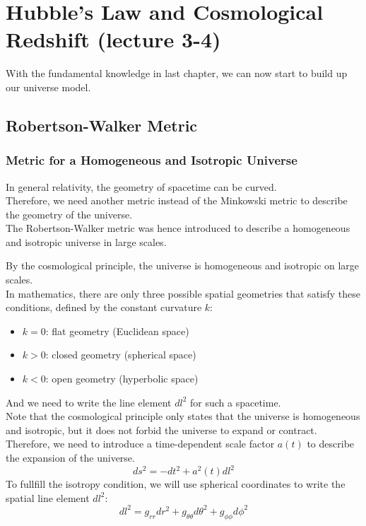 
\chapter{Hubble's Law and Cosmological Redshift (lecture 3-4)}
With the fundamental knowledge in last chapter, we can now start to build up our universe model. \\
\section{Robertson-Walker Metric}
\subsection{Metric for a Homogeneous and Isotropic Universe}
\begin{intuition}
    In general relativity, the geometry of spacetime can be curved. \\
    Therefore, we need another metric instead of the Minkowski metric to describe the geometry of the universe. \\
    The Robertson-Walker metric was hence introduced to describe a homogeneous and isotropic universe in large scales. 
\end{intuition}

\bigskip\noindent
\begin{theory}
    By the cosmological principle, the universe is homogeneous and isotropic on large scales. \\
    In mathematics, there are only three possible spatial geometries that satisfy these conditions, defined by the constant curvature $k$:
    \begin{itemize}
        \item $k = 0$: flat geometry (Euclidean space)
        \item $k > 0$: closed geometry (spherical space)   
        \item $k < 0$: open geometry (hyperbolic space)
    \end{itemize}

    And we need to write the line element $dl^2$ for such a spacetime. \\
    Note that the cosmological principle only states that the universe is homogeneous and isotropic, but it does not forbid the universe to expand or contract. \\
    Therefore, we need to introduce a time-dependent scale factor $a(t)$ to describe the expansion of the universe. \\
    \[
        ds^2 = -dt^2 + a^2(t) dl^2
    \]
    To fullfill the isotropy condition, we will use spherical coordinates to write the spatial line element $dl^2$:
    \[
        dl^2 = g_{rr} dr^2 + g_{\theta\theta} d\theta^2 + g_{\phi\phi} d\phi^2
    \]
\end{theory}

